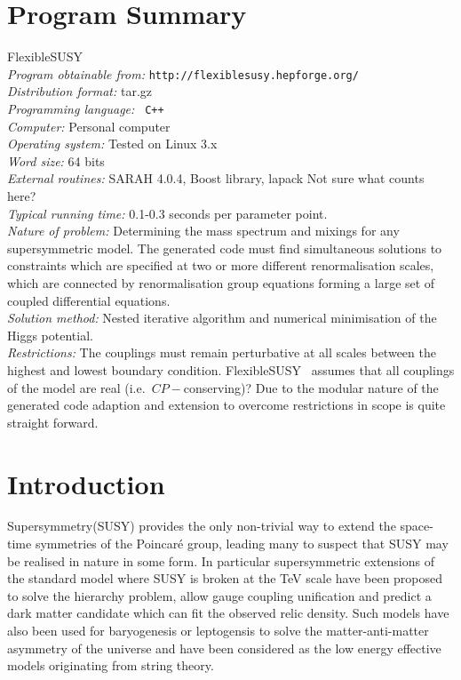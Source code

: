 \documentclass[final,3p,times,pdflatex]{elsarticle}
\newcommand{\fs}{FlexibleSUSY\xspace}
\begin{document}
\section{Program Summary}
 \fs\\ {\em Program obtainable from:}
         {\tt http://flexiblesusy.hepforge.org/}\\ {\em Distribution
           format:}\/ tar.gz\\ {\em Programming language:} {\tt
           C++}\\ {\em Computer:}\/ Personal computer\\ {\em Operating
           system:}\/ Tested on Linux 3.x\\ {\em Word size:}\/ 64
         bits\\ {\em External routines:}\/ SARAH 4.0.4, Boost library,
         lapack {\color{red} Not sure what counts here?}\\ {\em
           Typical running time:}\/ 0.1-0.3 seconds per parameter
         point.\\ {\em Nature of problem:}\/ Determining the mass
         spectrum and mixings for any supersymmetric model. The
         generated code must find simultaneous solutions to
         constraints which are specified at two or more different
         renormalisation scales, which are connected by
         renormalisation group equations forming a large set of
         coupled differential equations. \\ {\em Solution method:}\/
         Nested iterative algorithm and numerical minimisation of the
         Higgs potential.  \\ {\em Restrictions:} The couplings must
         remain perturbative at all scales between the highest and
         lowest boundary condition.  \fs~ assumes that all couplings
         of the model are real (i.e.\ $CP-$conserving)?  Due to the
         modular nature of the generated code adaption and extension
         to overcome restrictions in scope is quite straight forward.





\newpage
\section{Introduction}
Supersymmetry(SUSY) provides the only non-trivial way to extend the
space-time symmetries of the Poincar\'e
group\cite{Coleman:1967ad,Haag:1974qh}, leading many to suspect that
SUSY may be realised in nature in some form. In particular
supersymmetric extensions of the standard model where SUSY is broken
at the TeV scale have been proposed to solve the hierarchy
problem\cite{Weinberg:1975gm, Weinberg:1979bn, Gildener:1976ai,
  Susskind:1978ms, 'tHooft:1980xb}, allow gauge coupling
unification\cite{Langacker:1990jh, Ellis:1990wk, Amaldi:1991cn,
  Langacker:1991an, Giunti:1991ta} and predict a dark matter candidate
which can fit the observed relic
density\cite{Goldberg:1983nd,Ellis:1983ew}.  Such models have also
been used for baryogenesis or leptogensis to solve the
matter-anti-matter asymmetry of the universe and have been considered
as the low energy effective models originating from string
theory.
\end{document}
